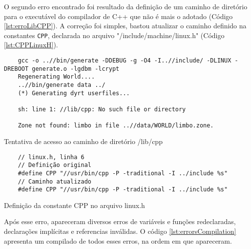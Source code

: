 O segundo erro encontrado foi resultado da definição de um caminho de diretório para o executável do 
compilador de C++ que não é mais o adotado (Código \ref{lst:erroLibCPP}). A correção foi simples, bastou atualizar o caminho definido 
na constantes \verb|CPP|, declarada no arquivo "/include/machine/linux.h" (Código \ref{lst:CPPLinuxH}).

\begin{listing}[!ht]
    \begin{verbatim}
    gcc -o ..//bin/generate -DDEBUG -g -O4 -I..//include/ -DLINUX -DREBOOT generate.o -lgdbm -lcrypt
    Regenerating World....
    ..//bin/generate data ../
    (*) Generating dyrt userfiles...

    sh: line 1: //lib/cpp: No such file or directory

    Zone not found: limbo in file ..//data/WORLD/limbo.zone.
    \end{verbatim}
\caption{Tentativa de acesso ao caminho de diretório /lib/cpp}
\label{lst:erroLibCPP}
\end{listing}

\begin{listing}[!ht]
    \begin{verbatim}
    // linux.h, linha 6
    // Definição original
    #define CPP "//usr/bin/cpp -P -traditional -I ../include %s"
    // Caminho atualizado
    #define CPP "//usr/bin/cpp -P -traditional -I ../include %s"
    \end{verbatim}
\caption{Definição da constante CPP no arquivo linux.h}
\label{lst:CPPLinuxH}
\end{listing}

Após esse erro, apareceram diversos erros de variáveis e funções redeclaradas, declarações implícitas e 
referencias inválidas. O código \ref{lst:errorsCompilation} apresenta um compilado de todos esses erros, 
na ordem em que apareceram. 

